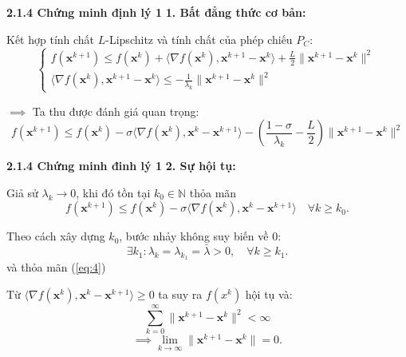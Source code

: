 \begin{frame}{\textbf{\large 2.1.4 Chứng minh định lý 1}}
    \vspace*{-1cm}
    \textbf{1. Bất đẳng thức cơ bản:}
    
    Kết hợp tính chất $L$-Lipschitz và tính chất của phép chiếu $P_C$:
    \begin{equation*}
        \begin{cases}
             f(\mathbf{x}^{k+1}) \le f(\mathbf{x}^k) + \langle \nabla f(\mathbf{x}^k), \mathbf{x}^{k+1} - \mathbf{x}^k \rangle + \frac{L}{2} \|\mathbf{x}^{k+1} - \mathbf{x}^k\|^2 \\
             \langle \nabla f(\mathbf{x}^k), \mathbf{x}^{k+1} - \mathbf{x}^k \rangle \le -\frac{1}{\lambda_k} \|\mathbf{x}^{k+1} - \mathbf{x}^k\|^2
        \end{cases}
    \end{equation*}

    \pause
    $\implies$ Ta thu được đánh giá quan trọng:
    \begin{equation} \label{eq:main_descent}
        \boxed{ f(\mathbf{x}^{k+1}) \le f(\mathbf{x}^k) - \sigma \langle \nabla f(\mathbf{x}^k),\mathbf{x}^k - \mathbf{x}^{k+1} \rangle - \left( \frac{1-\sigma}{\lambda_k} - \frac{L}{2} \right) \|\mathbf{x}^{k+1} - \mathbf{x}^k\|^2 }
    \end{equation}
\end{frame}

\begin{frame}{\textbf{\large 2.1.4 Chứng minh đinh lý 1}}
    \vspace*{-1cm}
    \textbf{2. Sự hội tụ: }
    
    Giả sử $\lambda_k \to 0$, khi đó tồn tại $k_0 \in \mathbb{N}$ thỏa mãn
    \begin{equation} \label{eq:4}
        f(\mathbf{x}^{k+1}) \le f(\mathbf{x}^k) - \sigma \langle \nabla f(\mathbf{x}^k), \mathbf{x}^k-\mathbf{x}^{k+1} \rangle \quad \forall k \ge k_0. 
    \end{equation}
    
    Theo cách xây dựng $k_0$, bước nhảy không suy biến về 0:
    $$ \exists k_1: \lambda_k = \lambda_{k_1} = \bar{\lambda} > 0, \quad \forall k \ge k_1. $$ và thỏa mãn (\ref{eq:4})
    
    Từ $\langle \nabla f(\mathbf{x}^k),\mathbf{x}^k - \mathbf{x}^{k+1} \rangle \ge 0$ ta suy ra {$f(x^k)$} hội tụ và:
    $$ \sum_{k=0}^{\infty} \|\mathbf{x}^{k+1} - \mathbf{x}^k\|^2 < \infty $$
    \begin{equation} \label{eq:5}
        \implies \lim_{k \to \infty} \|\mathbf{x}^{k+1} - \mathbf{x}^k\| = 0.
    \end{equation}
\end{frame}

